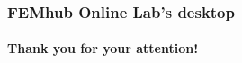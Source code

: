 \documentclass{beamer}
\begin{document}
\begin{frame}
    \frametitle{FEMhub Online Lab's desktop}
    \framesubtitle{}

    \begin{center}
    \end{center}
\end{frame}

%

%

\begin{frame}[plain]
    \begin{center}
        \textbf{Thank you for your attention!}
    \end{center}
\end{frame}
\end{document}
